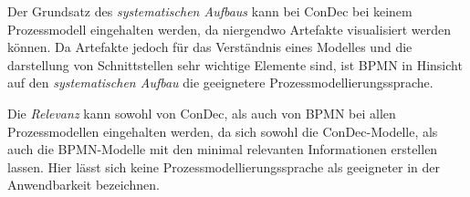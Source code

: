 Der  Grundsatz des \textit{systematischen Aufbaus} kann bei ConDec bei keinem Prozessmodell eingehalten werden, da niergendwo Artefakte visualisiert werden können. Da Artefakte jedoch für das Verständnis eines Modelles und die darstellung von Schnittstellen sehr wichtige Elemente sind, ist BPMN in Hinsicht auf den \textit{systematischen Aufbau} die geeignetere Prozessmodellierungssprache. \newline


Die \textit{Relevanz} kann sowohl von ConDec, als auch von BPMN bei allen Prozessmodellen eingehalten werden, da sich sowohl die ConDec-Modelle, als auch die BPMN-Modelle mit den minimal relevanten Informationen erstellen lassen. Hier lässt sich keine Prozessmodellierungssprache als geeigneter in der Anwendbarkeit  bezeichnen.\newline

